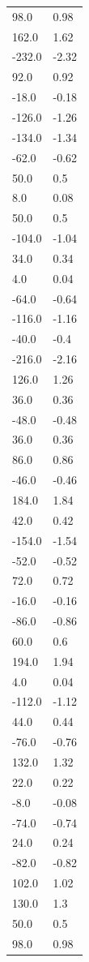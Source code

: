 \begin{longtable}{ll}
98.0 & 0.98 \\
162.0 & 1.62 \\
-232.0 & -2.32 \\
92.0 & 0.92 \\
-18.0 & -0.18 \\
-126.0 & -1.26 \\
-134.0 & -1.34 \\
-62.0 & -0.62 \\
50.0 & 0.5 \\
8.0 & 0.08 \\
50.0 & 0.5 \\
-104.0 & -1.04 \\
34.0 & 0.34 \\
4.0 & 0.04 \\
-64.0 & -0.64 \\
-116.0 & -1.16 \\
-40.0 & -0.4 \\
-216.0 & -2.16 \\
126.0 & 1.26 \\
36.0 & 0.36 \\
-48.0 & -0.48 \\
36.0 & 0.36 \\
86.0 & 0.86 \\
-46.0 & -0.46 \\
184.0 & 1.84 \\
42.0 & 0.42 \\
-154.0 & -1.54 \\
-52.0 & -0.52 \\
72.0 & 0.72 \\
-16.0 & -0.16 \\
-86.0 & -0.86 \\
60.0 & 0.6 \\
194.0 & 1.94 \\
4.0 & 0.04 \\
-112.0 & -1.12 \\
44.0 & 0.44 \\
-76.0 & -0.76 \\
132.0 & 1.32 \\
22.0 & 0.22 \\
-8.0 & -0.08 \\
-74.0 & -0.74 \\
24.0 & 0.24 \\
-82.0 & -0.82 \\
102.0 & 1.02 \\
130.0 & 1.3 \\
50.0 & 0.5 \\
98.0 & 0.98 \\

\end{longtable}

